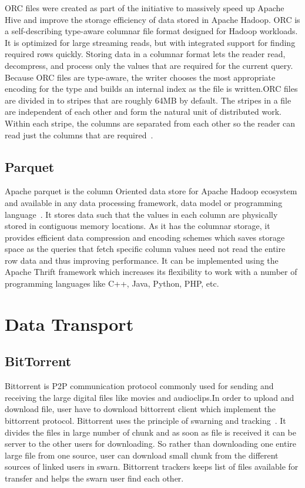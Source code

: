 ORC files were created as part of the initiative to massively speed up
Apache Hive and improve the storage efficiency of data stored in
Apache Hadoop. ORC is a self-describing type-aware columnar file
format designed for Hadoop workloads. It is optimized for large
streaming reads, but with integrated support for finding required rows
quickly. Storing data in a columnar format lets the reader read,
decompress, and process only the values that are required for the
current query. Because ORC files are type-aware, the writer chooses
the most appropriate encoding for the type and builds an internal
index as the file is written.ORC files are divided in to stripes that
are roughly 64MB by default. The stripes in a file are independent of
each other and form the natural unit of distributed work. Within each
stripe, the columns are separated from each other so the reader can
read just the columns that are required~\cite{www-orc-docs}.

     
\subsection{Parquet}

Apache parquet is the column Oriented data store for Apache Hadoop
ecosystem and available in any data processing framework, data model
or programming language~\cite{www-parquet}. It stores data such that
the values in each column are physically stored in contiguous memory
locations. As it has the columnar storage, it provides efficient data
compression and encoding schemes which saves storage space as the
queries that fetch specific column values need not read the entire row
data and thus improving performance. It can be implemented using the
Apache Thrift framework which increases its flexibility to work with a
number of programming languages like C++, Java, Python, PHP, etc.
     
\section{Data Transport}
\label{S:o-data-transport}

\subsection{BitTorrent}

Bittorrent is P2P communication protocol commonly used for sending and
receiving the large digital files like movies and audioclips.In order
to upload and download file, user have to download bittorrent client
which implement the bittorrent protocol. Bittorrent uses the principle
of swarning and tracking~\cite{www-bittorrent}. It divides the files
in large number of chunk and as soon as file is received it can be
server to the other users for downloading.  So rather than downloading
one entire large file from one source, user can download small chunk
from the different sources of linked users in swarn. Bittorrent
trackers keeps list of files available for transfer and helps the
swarn user find each other.

